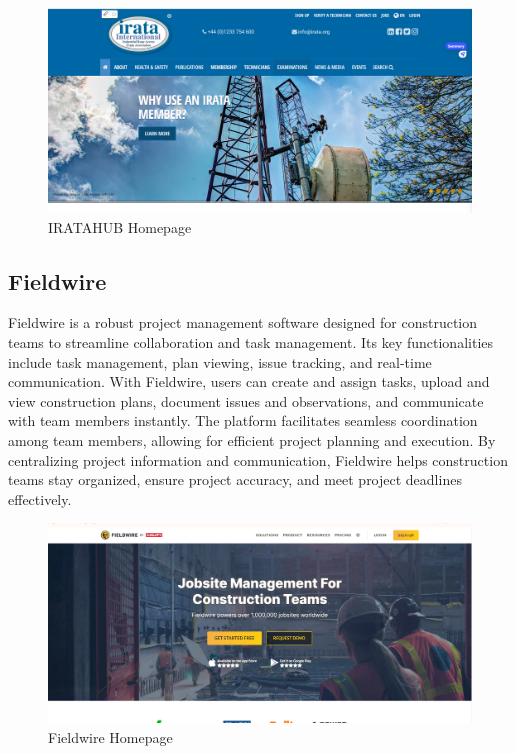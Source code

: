 \begin{figure}[H]
    \centering
    \includegraphics[width=\linewidth]{src/assets/chapters/iratahub.PNG}
    \caption{IRATAHUB Homepage}
    \label{fig:iratahub_image}
\end{figure}

\subsection{Fieldwire}
Fieldwire is a robust project management software designed for construction teams to streamline collaboration and task management. Its key functionalities include task management, plan viewing, issue tracking, and real-time communication. With Fieldwire, users can create and assign tasks, upload and view construction plans, document issues and observations, and communicate with team members instantly. The platform facilitates seamless coordination among team members, allowing for efficient project planning and execution. By centralizing project information and communication, Fieldwire helps construction teams stay organized, ensure project accuracy, and meet project deadlines effectively.

\begin{figure}[H]
    \centering
    \includegraphics[width=\linewidth]{src/assets/chapters/fieldwire.PNG}
    \caption{Fieldwire Homepage}
    \label{fig:fieldwire_image}
\end{figure}

